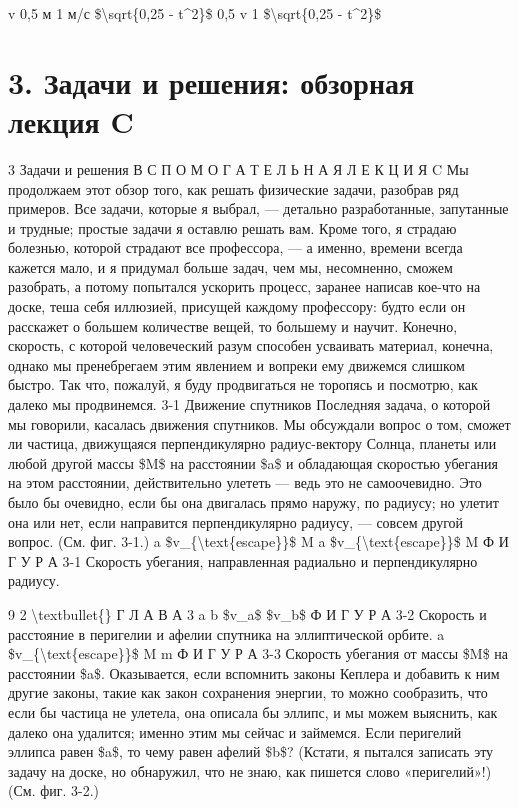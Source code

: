 \documentclass[10pt,oneside]{article}
\newcommand{\TipsRunning}[1]{\par\vspace{2bp}{\centering\footnotesize #1\par}\vspace{2bp}}
\begin{document}
v 0,5 м 1 м/с \$\textbackslash{}sqrt\{0,25 - t\textasciicircum{}2\}\$ 0,5 v 1 \$\textbackslash{}sqrt\{0,25 - t\textasciicircum{}2\}\$\par

\TipsRunning{Р И С У Н О К  2 - 1 6}

\clearpage
{}
\section*{3. Задачи и решения: обзорная лекция C}
\label{tips-sec-11-3-задачи-и-решения-обзорная-лекция-c}
3 Задачи и решения В С П О М О Г А Т Е Л Ь Н А Я  Л Е К Ц И Я  C Мы продолжаем этот обзор того, как решать физические задачи, разобрав ряд примеров. Все задачи, которые я выбрал, --- детально разработанные, запутанные и трудные; простые задачи я оставлю решать вам. Кроме того, я страдаю болезнью, которой страдают все профессора, --- а именно, времени всегда кажется мало, и я придумал больше задач, чем мы, несомненно, сможем разобрать, а потому попытался ускорить процесс, заранее написав кое-что на доске, теша себя иллюзией, присущей каждому профессору: будто если он расскажет о большем количестве вещей, то большему и научит. Конечно, скорость, с которой человеческий разум способен усваивать материал, конечна, однако мы пренебрегаем этим явлением и вопреки ему движемся слишком быстро. Так что, пожалуй, я буду продвигаться не торопясь и посмотрю, как далеко мы продвинемся. 3-1 Движение спутников Последняя задача, о которой мы говорили, касалась движения спутников. Мы обсуждали вопрос о том, сможет ли частица, движущаяся перпендикулярно радиус-вектору Солнца, планеты или любой другой массы \$M\$ на расстоянии \$a\$ и обладающая скоростью убегания на этом расстоянии, действительно улететь --- ведь это не самоочевидно. Это было бы очевидно, если бы она двигалась прямо наружу, по радиусу; но улетит она или нет, если направится перпендикулярно радиусу, --- совсем другой вопрос. (См. фиг. 3-1.) a \$v\_\{\textbackslash{}text\{escape\}\}\$ M a \$v\_\{\textbackslash{}text\{escape\}\}\$ M Ф И Г У Р А  3-1 Скорость убегания, направленная радиально и перпендикулярно радиусу.\par

9 2 \textbackslash{}textbullet\{\} Г Л А В А  3 a b \$v\_a\$ \$v\_b\$ Ф И Г У Р А  3-2 Скорость и расстояние в перигелии и афелии спутника на эллиптической орбите. a \$v\_\{\textbackslash{}text\{escape\}\}\$ M m Ф И Г У Р А  3-3 Скорость убегания от массы \$M\$ на расстоянии \$a\$. Оказывается, если вспомнить законы Кеплера и добавить к ним другие законы, такие как закон сохранения энергии, то можно сообразить, что если бы частица не улетела, она описала бы эллипс, и мы можем выяснить, как далеко она удалится; именно этим мы сейчас и займемся. Если перигелий эллипса равен \$a\$, то чему равен афелий \$b\$? (Кстати, я пытался записать эту задачу на доске, но обнаружил, что не знаю, как пишется слово «перигелий»!) (См. фиг. 3-2.)\par
\end{document}
